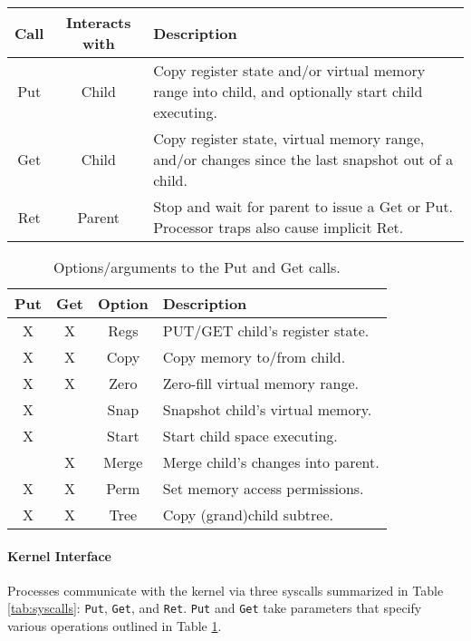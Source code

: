 \begin{center}
\begin{table*}[t]
\centering
\begin{tabular}{c | c | l}
Call & Interacts with & Description \\
\hline
Put & Child & Copy register state and/or virtual memory range into child, and optionally start child executing. \\
Get & Child & Copy register state, virtual memory range, and/or changes since the last snapshot out of a child. \\
Ret & Parent & Stop and wait for parent to issue a Get or Put. Processor traps also cause implicit Ret. \\
\end{tabular}
\caption{System calls comprising Determinator’s kernel API.}
\label{tab:syscalls}
\end{table*}
\end{center}

\begin{center}
\begin{table}[t]
\begin{tabular}{c | c | c | l}
Put & Get & Option & Description \\
\hline
X & X & Regs & PUT/GET child’s register state. \\
X & X & Copy & Copy memory to/from child. \\
X & X & Zero & Zero-fill virtual memory range. \\
X &  & Snap & Snapshot child’s virtual memory. \\
X &  & Start & Start child space executing. \\
 & X & Merge & Merge child’s changes into parent. \\
X & X & Perm & Set memory access permissions. \\
X & X & Tree & Copy (grand)child subtree. \\
\end{tabular}
\caption{Options/arguments to the Put and Get calls.}
\label{tab:options}
\end{table}
\end{center}

\paragraph{Kernel Interface} Processes communicate with the kernel via three
syscalls summarized in Table \ref{tab:syscalls}: {\tt Put}, {\tt Get}, and
{\tt Ret}. {\tt Put} and {\tt Get} take parameters that specify various
operations outlined in Table \ref{tab:options}.

